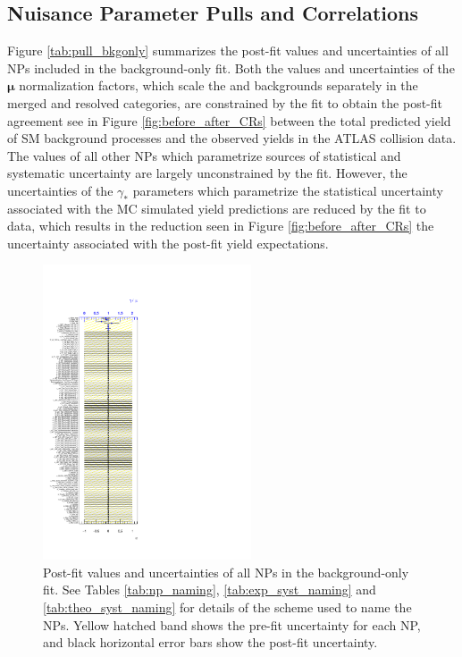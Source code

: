 \subsection{Nuisance Parameter Pulls and Correlations}

Figure \ref{tab:pull_bkgonly} summarizes the post-fit values and uncertainties of all NPs included in the background-only fit. Both the values and uncertainties of the \(\boldsymbol{\mu}\) normalization factors, which scale the \wjets and \ttbar backgrounds separately in the merged and resolved categories, are constrained by the fit to obtain the post-fit agreement see in Figure \ref{fig:before_after_CRs} between the total predicted yield of SM background processes and the observed yields in the ATLAS collision data. The values of all other NPs which parametrize sources of statistical and systematic uncertainty are largely unconstrained by the fit. However, the uncertainties of the \(\gamma_*\) parameters which parametrize the statistical uncertainty associated with the MC simulated yield predictions are reduced by the fit to data,  which results in the reduction seen in Figure \ref{fig:before_after_CRs} the uncertainty associated with the post-fit yield expectations.

\begin{figure}[h]
  \centering
  \includegraphics[width=0.55\textwidth]{Figures/8/BkgOnly/fit_parameters.pdf}
  \caption[Pull plots for background-only fit]{\footnotesize{Post-fit values and uncertainties of all NPs in the background-only fit. See Tables \ref{tab:np_naming}, \ref{tab:exp_syst_naming} and \ref{tab:theo_syst_naming} for details of the scheme used to name the NPs. Yellow hatched band shows the pre-fit uncertainty for each NP, and black horizontal error bars show the post-fit uncertainty.}}
  \label{fig:pull_bkgonly}
\end{figure}

